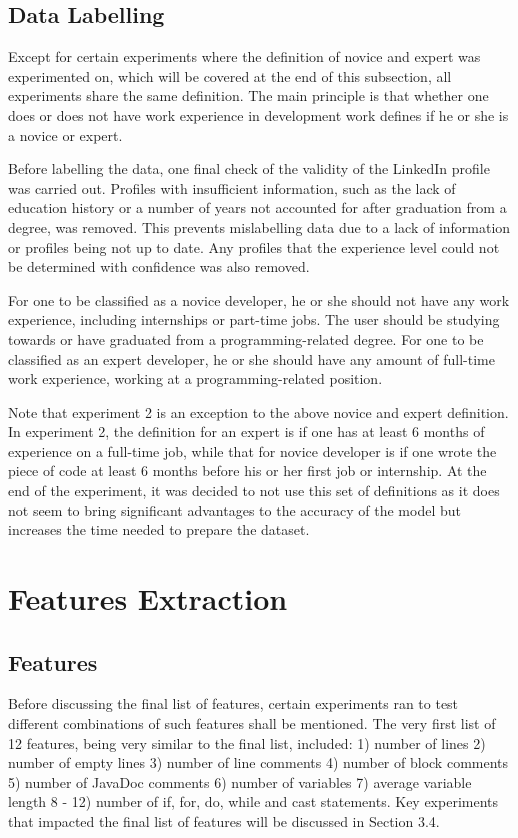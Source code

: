 \documentclass{report}
\begin{document}
\subsection{Data Labelling}

Except for certain experiments where the definition of novice and expert was experimented on, which will be covered at the end of this subsection, all experiments share the same definition. The main principle is that whether one does or does not have work experience in development work defines if he or she is a novice or expert.

Before labelling the data, one final check of the validity of the LinkedIn profile was carried out. Profiles with insufficient information, such as the lack of education history or a number of years not accounted for after graduation from a degree, was removed. This prevents mislabelling data due to a lack of information or profiles being not up to date. Any profiles that the experience level could not be determined with confidence was also removed.

For one to be classified as a novice developer, he or she should not have any work experience, including internships or part-time jobs. The user should be studying towards or have graduated from a programming-related degree. For one to be classified as an expert developer, he or she should have any amount of full-time work experience, working at a programming-related position.

Note that experiment 2 is an exception to the above novice and expert definition. In experiment 2, the definition for an expert is if one has at least 6 months of experience on a full-time job, while that for novice developer is if one wrote the piece of code at least 6 months before his or her first job or internship. At the end of the experiment, it was decided to not use this set of definitions as it does not seem to bring significant advantages to the accuracy of the model but increases the time needed to prepare the dataset.

\section{Features Extraction}

\subsection{Features}

Before discussing the final list of features, certain experiments ran to test different combinations of such features shall be mentioned. The very first list of 12 features, being very similar to the final list, included: 1) number of lines 2) number of empty lines 3) number of line comments 4) number of block comments 5) number of JavaDoc comments 6) number of variables 7) average variable length 8 - 12) number of if, for, do, while and cast statements. Key experiments that impacted the final list of features will be discussed in Section 3.4.
\end{document}
